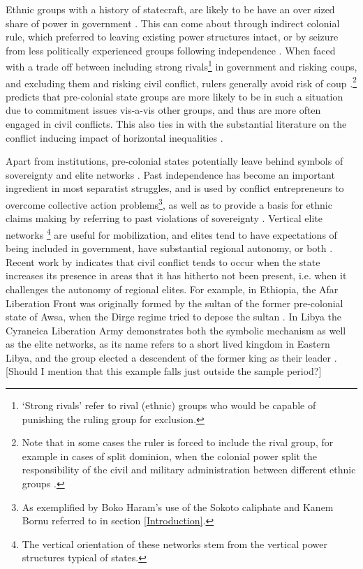 \documentclass[12pt]{article}
\begin{document}
Ethnic groups with a history of statecraft, are likely to be have an over sized
share of power in government \citep{Wucherpfennig2016}. This can come about
through indirect colonial rule, which preferred to leaving existing power
structures intact, or by seizure from less politically experienced groups
following independence \citep{Paine2019}. When faced with a trade off between
including strong rivals\footnote{`Strong rivals' refer to rival (ethnic) groups
who would be capable of punishing the ruling group for exclusion.} in government
and risking coups, and excluding them and risking civil conflict, rulers
generally avoid risk of coup \citep{Paine2019, Powell_2014,
	Roessler_2011}.\footnote{Note that in some cases the ruler is forced to
include the rival group, for example in cases of split dominion, when the
colonial power split the responsibility of the civil and military administration
between different ethnic groups \citep{Paine2019}.} \citet{Paine2019} predicts
that pre-colonial state groups are more likely to be in such a situation due to
commitment issues vis-a-vis other groups, and thus are more often engaged in
civil conflicts. This also ties in with the substantial literature on the
conflict inducing impact of horizontal inequalities \citep{CEDERMAN_2011}.

Apart from institutions, pre-colonial states potentially leave behind symbols of
sovereignty and elite networks \citep{Wishman}. Past independence has become an
important ingredient in most separatist struggles, and is used by conflict
entrepreneurs to overcome collective action problems\footnote{As exemplified by
Boko Haram's use of the Sokoto caliphate and Kanem Bornu referred to in section
\ref{Introduction}.}, as well as to provide a basis for ethnic claims making by
referring to past violations of sovereignty \citep{Ahram2019, Shelef2016}.
Vertical elite networks \footnote{The vertical orientation of these networks
stem from the vertical power structures typical of states.} are useful for
mobilization, and elites tend to have expectations of being included in
government, have substantial regional autonomy, or both \citep{Wishman}. Recent
work by \citet{Ying_2020} indicates that civil conflict tends to occur when the
state increases its presence in areas that it has hitherto not been present,
i.e. when it challenges the autonomy of regional elites. For example, in
Ethiopia, the Afar Liberation Front was originally formed by the sultan of the
former pre-colonial state of Awsa, when the Dirge regime tried to depose the
sultan \citep{Shehim1985, Hanfare2011}.  In Libya the Cyraneica Liberation Army
demonstrates both the symbolic mechanism as well as the elite networks, as its
name refers to a short lived kingdom in Eastern Libya, and the group elected a
descendent of the former king as their leader \citep{Ahram2019}. [Should I
mention that this example falls just outside the sample period?]
\end{document}
